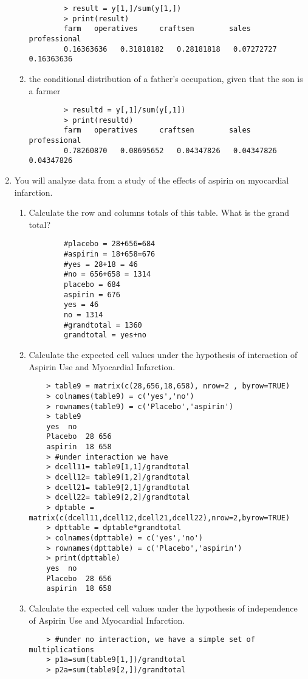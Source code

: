 \documentclass[11pt]{article}
\begin{document}
\begin{enumerate}
\begin{enumerate}
	\begin{verbatim}
		> result = y[1,]/sum(y[1,])
		> print(result)
		farm   operatives     craftsen        sales professional 
		0.16363636   0.31818182   0.28181818   0.07272727   0.16363636 
	\end{verbatim}
	\item the conditional distribution of a father’s occupation, given that the son is a farmer
	\begin{verbatim}
		> resultd = y[,1]/sum(y[,1])
		> print(resultd)
		farm   operatives     craftsen        sales professional 
		0.78260870   0.08695652   0.04347826   0.04347826   0.04347826 
	\end{verbatim}
\end{enumerate}
\item You will analyze data from a study of the effects of aspirin on myocardial infarction.
\begin{enumerate}
	\item Calculate the row and columns totals of this table. What is the grand total?
	\begin{verbatim}
		#placebo = 28+656=684
		#aspirin = 18+658=676
		#yes = 28+18 = 46
		#no = 656+658 = 1314
		placebo = 684
		aspirin = 676
		yes = 46
		no = 1314
		#grandtotal = 1360
		grandtotal = yes+no 
	\end{verbatim}
	\item Calculate the expected cell values under the hypothesis of interaction of Aspirin Use and Myocardial Infarction.
	\begin{verbatim}
	> table9 = matrix(c(28,656,18,658), nrow=2 , byrow=TRUE)
	> colnames(table9) = c('yes','no')
	> rownames(table9) = c('Placebo','aspirin')
	> table9
	yes  no
	Placebo  28 656
	aspirin  18 658
	> #under interaction we have
	> dcell11= table9[1,1]/grandtotal
	> dcell12= table9[1,2]/grandtotal
	> dcell21= table9[2,1]/grandtotal
	> dcell22= table9[2,2]/grandtotal
	> dptable = matrix(c(dcell11,dcell12,dcell21,dcell22),nrow=2,byrow=TRUE)
	> dpttable = dptable*grandtotal
	> colnames(dpttable) = c('yes','no')
	> rownames(dpttable) = c('Placebo','aspirin')
	> print(dpttable)
	yes  no
	Placebo  28 656
	aspirin  18 658
	\end{verbatim}
	\item Calculate the expected cell values under the hypothesis of independence of Aspirin Use and Myocardial Infarction.
	\begin{verbatim}
	> #under no interaction, we have a simple set of multiplications
	> p1a=sum(table9[1,])/grandtotal
	> p2a=sum(table9[2,])/grandtotal

\end{verbatim}
\end{enumerate}
\end{enumerate}
\end{document}
